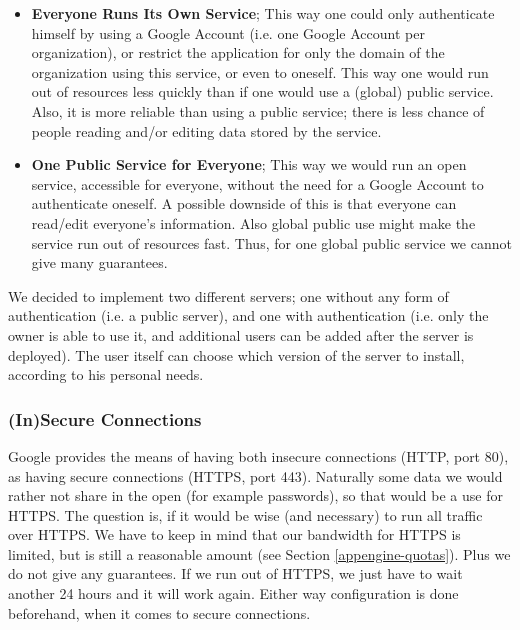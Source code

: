 \begin{itemize}
  \item \textbf{Everyone Runs Its Own Service}; This way one could only
  authenticate himself by using a Google Account (i.e. one Google Account per
  organization), or restrict the application for only the domain of the
  organization using this service, or even to oneself. This way one would run out
  of resources less quickly than if one would use a (global) public service.
  Also, it is more reliable than using a public service; there is less chance of
  people reading and/or editing data stored by the service.
  \item \textbf{One Public Service for Everyone}; This way we would run an open
  service, accessible for everyone, without the need for a Google Account to
  authenticate oneself. A possible downside of this is that everyone can
  read/edit everyone's information. Also global public use might make the service
  run out of resources fast. Thus, for one global public service we cannot give
  many guarantees.
\end{itemize}

We decided to implement two different servers; one without any form of
authentication (i.e. a public server), and one with authentication (i.e. only the
owner is able to use it, and additional users can be added after the server is
deployed). The user itself can choose which version of the server to install,
according to his personal needs.

\subsubsection{(In)Secure Connections}
Google provides the means of having both insecure connections (HTTP, port 80), as
having secure connections (HTTPS, port 443). Naturally some data we would rather
not share in the open (for example passwords), so that would be a use for HTTPS.
The question is, if it would be wise (and necessary) to run all traffic over
HTTPS. We have to keep in mind that our bandwidth for HTTPS is limited, but is
still a reasonable amount (see Section \ref{appengine-quotas}). Plus we do not
give any guarantees. If we run out of HTTPS, we just have to wait another 24
hours and it will work again. Either way configuration is done beforehand, when
it comes to secure connections.
